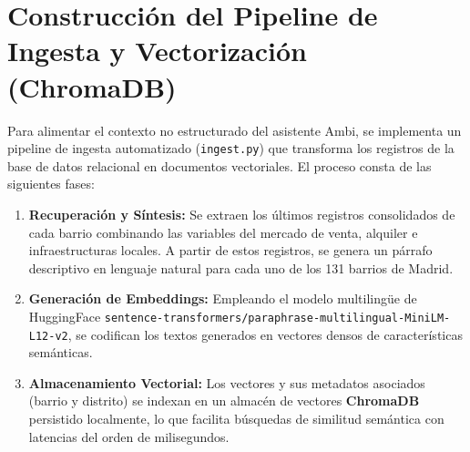 \documentclass[a4paper,11pt,openany]{book}
\begin{document}
\section{Construcción del Pipeline de Ingesta y Vectorización (ChromaDB)}
Para alimentar el contexto no estructurado del asistente Ambi, se implementa un pipeline de ingesta automatizado (\texttt{ingest.py}) que transforma los registros de la base de datos relacional en documentos vectoriales. El proceso consta de las siguientes fases:
\begin{enumerate}
    \item \textbf{Recuperación y Síntesis:} Se extraen los últimos registros consolidados de cada barrio combinando las variables del mercado de venta, alquiler e infraestructuras locales. A partir de estos registros, se genera un párrafo descriptivo en lenguaje natural para cada uno de los 131 barrios de Madrid.
    \item \textbf{Generación de Embeddings:} Empleando el modelo multilingüe de HuggingFace \texttt{sentence-transformers/paraphrase-multilingual-MiniLM-L12-v2}, se codifican los textos generados en vectores densos de características semánticas.
    \item \textbf{Almacenamiento Vectorial:} Los vectores y sus metadatos asociados (barrio y distrito) se indexan en un almacén de vectores \textbf{ChromaDB} persistido localmente, lo que facilita búsquedas de similitud semántica con latencias del orden de milisegundos.
\end{enumerate}
\end{document}

